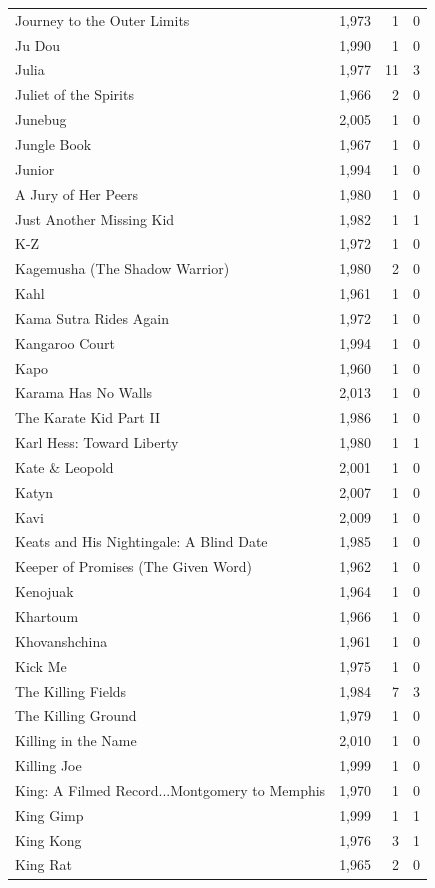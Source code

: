 \begin{tabular}{lrrr}
Journey to the Outer Limits & 1,973 & 1 & 0 \\
Ju Dou & 1,990 & 1 & 0 \\
Julia & 1,977 & 11 & 3 \\
Juliet of the Spirits & 1,966 & 2 & 0 \\
Junebug & 2,005 & 1 & 0 \\
Jungle Book & 1,967 & 1 & 0 \\
Junior & 1,994 & 1 & 0 \\
A Jury of Her Peers & 1,980 & 1 & 0 \\
Just Another Missing Kid & 1,982 & 1 & 1 \\
K-Z & 1,972 & 1 & 0 \\
Kagemusha (The Shadow Warrior) & 1,980 & 2 & 0 \\
Kahl & 1,961 & 1 & 0 \\
Kama Sutra Rides Again & 1,972 & 1 & 0 \\
Kangaroo Court & 1,994 & 1 & 0 \\
Kapo & 1,960 & 1 & 0 \\
Karama Has No Walls & 2,013 & 1 & 0 \\
The Karate Kid Part II & 1,986 & 1 & 0 \\
Karl Hess: Toward Liberty & 1,980 & 1 & 1 \\
Kate \& Leopold & 2,001 & 1 & 0 \\
Katyn & 2,007 & 1 & 0 \\
Kavi & 2,009 & 1 & 0 \\
Keats and His Nightingale: A Blind Date & 1,985 & 1 & 0 \\
Keeper of Promises (The Given Word) & 1,962 & 1 & 0 \\
Kenojuak & 1,964 & 1 & 0 \\
Khartoum & 1,966 & 1 & 0 \\
Khovanshchina & 1,961 & 1 & 0 \\
Kick Me & 1,975 & 1 & 0 \\
The Killing Fields & 1,984 & 7 & 3 \\
The Killing Ground & 1,979 & 1 & 0 \\
Killing in the Name & 2,010 & 1 & 0 \\
Killing Joe & 1,999 & 1 & 0 \\
King: A Filmed Record...Montgomery to Memphis & 1,970 & 1 & 0 \\
King Gimp & 1,999 & 1 & 1 \\
King Kong & 1,976 & 3 & 1 \\
King Rat & 1,965 & 2 & 0 \\

\end{tabular}
